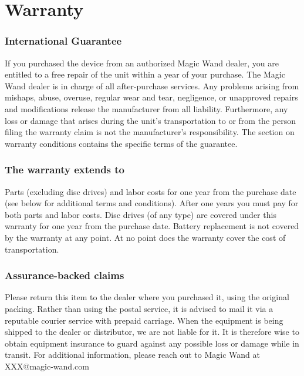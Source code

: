 %
%

\chapter{Warranty}

\subsection{International Guarantee}
If you purchased the device from an authorized Magic Wand dealer, you are entitled to a free repair of the unit within a year of your purchase. The Magic Wand dealer is in charge of all after-purchase services. Any problems arising from mishaps, abuse, overuse, regular wear and tear, negligence, or unapproved repairs and modifications release the manufacturer from all liability. Furthermore, any loss or damage that arises during the unit's transportation to or from the person filing the warranty claim is not the manufacturer's responsibility. The section on warranty conditions contains the specific terms of the guarantee. 

\subsection{The warranty extends to}
Parts (excluding disc drives) and labor costs for one year from the purchase date (see below for additional terms and conditions). After one years you must pay for both parts and labor costs.
Disc drives (of any type) are covered under this warranty for one year from the purchase date.
Battery replacement is not covered by the warranty at any point.
At no point does the warranty cover the cost of transportation.

\subsection{Assurance-backed claims}
Please return this item to the dealer where you purchased it, using the original packing. Rather than using the postal service, it is advised to mail it via a reputable courier service with prepaid carriage. When the equipment is being shipped to the dealer or distributor, we are not liable for it. It is therefore wise to obtain equipment insurance to guard against any possible loss or damage while in transit. For additional information, please reach out to Magic Wand at XXX@magic-wand.com
